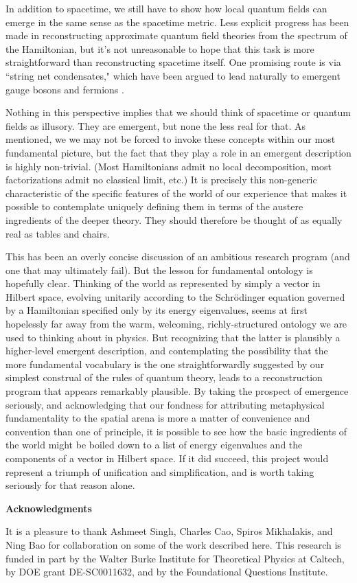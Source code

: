 \documentclass[12pt,english]{article}
\begin{document}
In addition to spacetime, we still have to show how local quantum fields can emerge in the same sense as the spacetime metric. 
Less explicit progress has been made in reconstructing approximate quantum field theories from the spectrum of the Hamiltonian, but it's not unreasonable to hope that this task is more straightforward than reconstructing spacetime itself.
One promising route is via ``string net condensates," which have been argued to lead naturally to emergent gauge bosons and fermions \citep{Levin:2004mi}.

Nothing in this perspective implies that we should think of spacetime or quantum fields as illusory.
They are emergent, but none the less real for that.
As mentioned, we we may not be forced to invoke these concepts within our most fundamental picture, but the fact that they play a role in an emergent description is highly non-trivial.
(Most Hamiltonians admit no local decomposition, most factorizations admit no classical limit, etc.)
It is precisely this non-generic characteristic of the specific features of the world of our experience that makes it possible to contemplate uniquely defining them in terms of the austere ingredients of the deeper theory.
They should therefore be thought of as equally real as tables and chairs.

This has been an overly concise discussion of an ambitious research program (and one that may ultimately fail).
But the lesson for fundamental ontology is hopefully clear.
Thinking of the world as represented by simply a vector in Hilbert space, evolving unitarily according to the Schr\"odinger equation governed by a Hamiltonian specified only by its energy eigenvalues, seems at first hopelessly far away from the warm, welcoming, richly-structured ontology we are used to thinking about in physics.
But recognizing that the latter is plausibly a higher-level emergent description, and contemplating the possibility that the more fundamental vocabulary is the one straightforwardly suggested by our simplest construal of the rules of quantum theory, leads to a reconstruction program that appears remarkably plausible.
By taking the prospect of emergence seriously, and acknowledging that our fondness for attributing metaphysical fundamentality to the spatial arena is more a matter of convenience and convention than one of principle, it is possible to see how the basic ingredients of the world might be boiled down to a list of energy eigenvalues and the components of a vector in Hilbert space.
If it did succeed, this project would represent a triumph of unification and simplification, and is worth taking seriously for that reason alone.




\begin{center} 
 {\bf Acknowledgments}
 \end{center}

It is a pleasure to thank Ashmeet Singh, Charles Cao, Spiros Mikhalakis, and Ning Bao for collaboration on some of the work described here.
This research is funded in part by the Walter Burke Institute for Theoretical Physics at Caltech, by DOE grant DE-SC0011632, and by the Foundational Questions Institute.



\end{document}
